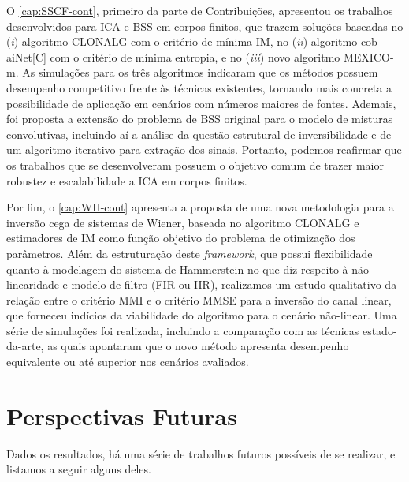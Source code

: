 O \autoref{cap:SSCF-cont}, primeiro da parte de Contribuições, apresentou os trabalhos desenvolvidos para ICA e BSS em corpos finitos, que trazem soluções baseadas no (\emph{i}) algoritmo CLONALG com o critério de mínima IM, no (\emph{ii}) algoritmo cob-aiNet[C] com o critério de mínima entropia, e no (\emph{iii}) novo algoritmo MEXICO-m. As simulações para os três algoritmos indicaram que os métodos possuem desempenho competitivo frente às técnicas existentes, tornando mais concreta a possibilidade de aplicação em cenários com números maiores de fontes. Ademais, foi proposta a extensão do problema de BSS original para o modelo de misturas convolutivas, incluindo aí a análise da questão estrutural de inversibilidade e de um algoritmo iterativo para extração dos sinais. Portanto, podemos reafirmar que os trabalhos que se desenvolveram possuem o objetivo comum de trazer maior robustez e escalabilidade a ICA em corpos finitos.

Por fim, o \autoref{cap:WH-cont} apresenta a proposta de uma nova metodologia para a inversão cega de sistemas de Wiener, baseada no algoritmo CLONALG e estimadores de IM como função objetivo do problema de otimização dos parâmetros. Além da estruturação deste \emph{framework}, que possui flexibilidade quanto à modelagem do sistema de Hammerstein no que diz respeito à não-linearidade e modelo de filtro (FIR ou IIR), realizamos um estudo qualitativo da relação entre o critério MMI e o critério MMSE para a inversão do canal linear, que forneceu indícios da viabilidade do algoritmo para o cenário não-linear. Uma série de simulações foi realizada, incluindo a comparação com as técnicas estado-da-arte, as quais apontaram que o novo método apresenta desempenho equivalente ou até superior nos cenários avaliados.

\section*{Perspectivas Futuras}

Dados os resultados, há uma série de trabalhos futuros possíveis de se realizar, e listamos a seguir alguns deles.

